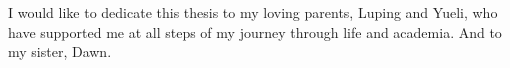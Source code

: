 
\begin{dedication}

I would like to dedicate this thesis to my loving parents, Luping and Yueli,
who have supported me at all steps of my journey through life and academia. And
to my sister, Dawn.

\end{dedication}

